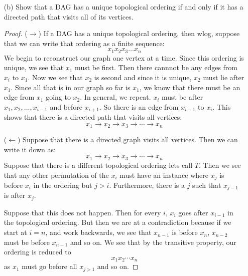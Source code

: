 \documentclass{article}
\begin{document}
\begin{itemize}
    \item [(b)] Show that a DAG has a unique topological ordering if and only if it has a directed path that visits all of its vertices.
        \begin{proof}
            ($\rightarrow$) If a DAG has a unique topological ordering, then wlog, suppose that we can write that ordering as a finite sequence:
                \begin{equation*}
                    x_{1}x_{2}x_{3}\ldots x_{n}
                \end{equation*}
            We begin to reconstruct our graph one vertex at a time. Since this ordering is unique, we see that $x_{1}$ must be first. Then there cannnot be any edges from $x_{i}$ to $x_{1}$. Now we see that $x_{2}$ is second and since it is unique, $x_{2}$ must lie after $x_{1}$. Since all that is in our graph so far is $x_{1}$, we know that there must be an edge from $x_{1}$ going to $x_{2}$. In general, we repeat. $x_{i}$ must be after $x_{1}, x_{2}, \ldots, x_{i - 1}$ and before $x_{i + 1}$. So there is an edge from $x_{i - 1}$ to $x_{i}$. This shows that there is a directed path that visits all vertices:
                \begin{equation*}
                    x_{1} \rightarrow x_{2} \rightarrow x_{3} \rightarrow \cdots \rightarrow x_{n}
                \end{equation*}

            ($\leftarrow$) Suppose that there is a directed graph visits all vertices. Then we can write it down as:
                \begin{equation*}
                    x_{1} \rightarrow x_{2} \rightarrow x_{3} \rightarrow \cdots \rightarrow x_{n}
                \end{equation*}
            Suppose that there is a different topological ordering lets call $T$. Then we see that any other permutation of the $x_{i}$ must have an instance where $x_{j}$ is before $x_{i}$ in the ordering but $j > i$. Furthermore, there is a $j$ such that $x_{j - 1}$ is after $x_{j}$.

            Suppose that this does not happen. Then for every $i$, $x_{i}$ goes after $x_{i - 1}$ in the topological ordering. But then we are at a contradiction because if we start at $i = n$, and work backwards, we see that $x_{n - 1}$ is before $x_{n}$, $x_{n - 2}$ must be before $x_{n - 1}$ and so on. We see that by the transitive property, our ordering is reduced to 
                \begin{equation*}
                    x_{1}x_{2} \cdots x_{n}
                \end{equation*}
            as $x_{1}$ must go before all $x_{j > 1}$ and so on.


\end{proof}
\end{itemize}
\end{document}
